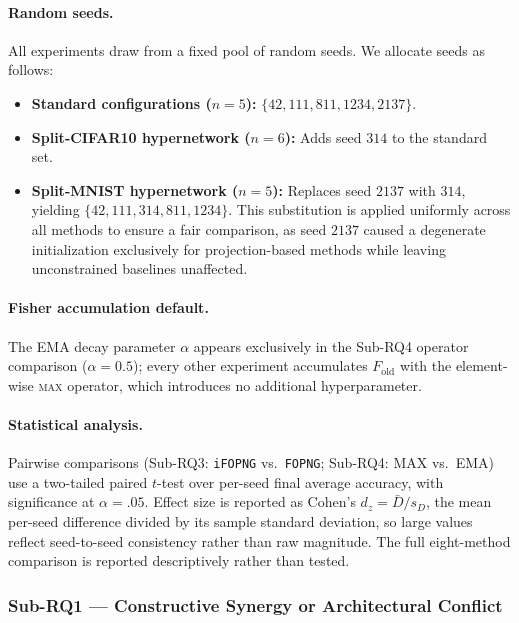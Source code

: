 \paragraph{Random seeds.}
All experiments draw from a fixed pool of random seeds. 
We allocate seeds as follows:
\begin{itemize}
    \item \textbf{Standard configurations ($n=5$):} $\{42, 111, 811, 1234, 2137\}$.
    \item \textbf{Split-CIFAR10 hypernetwork ($n=6$):} Adds seed $314$ to the standard set.
    \item \textbf{Split-MNIST hypernetwork ($n=5$):} Replaces seed $2137$ with $314$, yielding 
    $\{42, 111, 314, 811, 1234\}$. This substitution is applied uniformly across all methods 
    to ensure a fair comparison, as seed $2137$ caused a degenerate initialization exclusively
     for projection-based methods while leaving unconstrained baselines unaffected.
\end{itemize}

\paragraph{Fisher accumulation default.}
The EMA decay parameter $\alpha$ appears exclusively in the Sub-RQ4
operator comparison ($\alpha = 0.5$); every other experiment accumulates
$F_{\mathrm{old}}$ with the element-wise \textsc{max} operator,
which introduces no additional hyperparameter.

\paragraph{Statistical analysis.}
Pairwise comparisons (Sub-RQ3: \texttt{iFOPNG} vs.\ \texttt{FOPNG};
Sub-RQ4: MAX vs.\ EMA) use a two-tailed paired $t$-test over per-seed
final average accuracy, with significance at $\alpha = .05$. Effect size is
reported as Cohen's $d_z = \bar{D}/s_D$, the mean per-seed difference divided
by its sample standard deviation, so large values reflect seed-to-seed
consistency rather than raw magnitude. The full eight-method comparison is
reported descriptively rather than tested.

 
\subsubsection{Sub-RQ1 --- Constructive Synergy or Architectural Conflict}
\label{sec:design_rq1}

